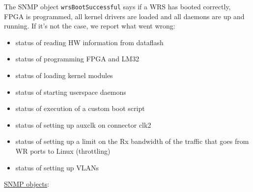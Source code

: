 \begin{pck_descr}
				The SNMP object \texttt{wrsBootSuccessful} says if a WRS has booted
				correctly, FPGA is programmed, all kernel drivers are loaded and all
				daemons are up and running. If it's not the case, we report what went
				wrong:
				\begin{itemize}
					\item status of reading HW information from dataflash
					\item status of programming FPGA and LM32
					\item status of loading kernel modules
					\item status of starting userspace daemons
					\item status of execution of a custom boot script
					\item status of setting up auxclk on connector clk2
					\item status of setting up a limit on the Rx bandwidth of the traffic that
					      goes from WR ports to Linux (throttling)
					\item status of setting up VLANs
				\end{itemize}
			\item [] \underline{SNMP objects}:\\
        {\footnotesize
				\\
				\\
				\\
				\\
				\\
				\\
				\\
				\\
				\\
				\\
				\\
				\\
				\\
				\\
				\\
}
\end{pck_descr}

